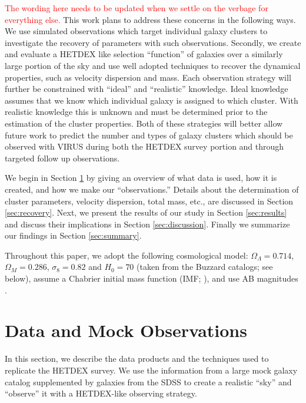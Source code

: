 \documentclass[fleqn,usenatbib]{mnras}
\newcommand{\editorial}[1]{\textcolor{red}{#1}}
\begin{document}
\editorial{The wording here needs to be updated when we settle on the verbage for everything else.} This work plans to address these concerns in the following ways. We use simulated observations which target individual galaxy clusters to investigate the recovery of parameters with such observations. Secondly, we create and evaluate a HETDEX like selection ``function'' of galaxies over a similarly large portion of the sky and use well adopted techniques to recover the dynamical properties, such as velocity dispersion and mass. Each observation strategy will further be constrained with ``ideal'' and ``realistic'' knowledge. Ideal knowledge assumes that we know which individual galaxy is assigned to which cluster. With realistic knowledge this is unknown and must be determined prior to the estimation of the cluster properties. Both of these strategies will better allow future work to predict the number and types of galaxy clusters which should be observed with VIRUS during both the HETDEX survey portion and through targeted follow up observations.

We begin in Section \ref{sec:Data} by giving an overview of what data is used, how it is created, and how we make our ``observations.'' Details about the determination of cluster parameters, velocity dispersion, total mass, etc., are discussed in Section \ref{sec:recovery}. Next, we present the results of our study in Section \ref{sec:results} and discuss their implications in Section \ref{sec:discussion}. Finally we summarize our findings in Section \ref{sec:summary}.

Throughout this paper, we adopt the following cosmological model: $\Omega_\Lambda = 0.714$, $\Omega_M = 0.286$, $\sigma_8 = 0.82$ and $H_0= 70$ \kms \mpc (taken from the Buzzard catalogs; see below), assume a Chabrier initial mass function (IMF; \citealt{Chabrier2003}), and use AB magnitudes \citep{Oke1974}.

\section{Data and Mock Observations}\label{sec:Data}
In this section, we describe the data products and the techniques used to replicate the HETDEX survey. We use the information from a large mock galaxy catalog supplemented by galaxies from the SDSS to create a realistic ``sky'' and ``observe'' it with a HETDEX-like observing strategy.
\end{document}
